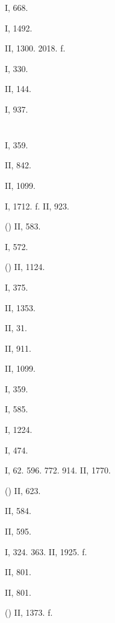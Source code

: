  I, 668.

 I, 1492.

 II, 1300. 2018. f.

 I, 330.

 II, 144.

 I, 937.

\section{}

 I, 359.

 II, 842.

 II, 1099.

 I, 1712. f. II, 923.

 () II, 583.

 I, 572.

 () II, 1124.

 I, 375.

 II, 1353.

 II, 31.

 II, 911.

 II, 1099.

 I, 359.

 I, 585.

 I, 1224.

 I, 474.

 I, 62. 596. 772. 914. II, 1770.

 () II, 623.

 II, 584.

 II, 595.

 I, 324. 363. II, 1925. f.

 II, 801.

 II, 801.

 () II, 1373. f.

\section{}

